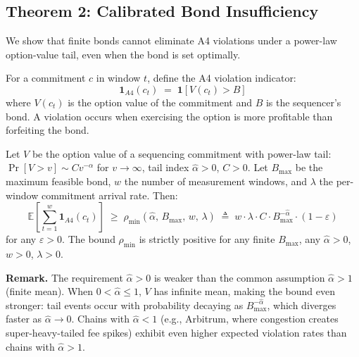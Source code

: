 
\subsection{Theorem 2: Calibrated Bond Insufficiency}
\label{sec:thm2}

We show that finite bonds cannot eliminate A4 violations under a power-law
option-value tail, even when the bond is set optimally.

\begin{definition}
\label{def:a4-viol}
For a commitment $c$ in window $t$, define the A4 violation indicator:
\[
  \mathbf{1}_{A4}(c_t) \;=\; \mathbf{1}\!\left[V(c_t) > B\right]
\]
where $V(c_t)$ is the option value of the commitment and $B$ is the sequencer's
bond. A violation occurs when exercising the option is more profitable than
forfeiting the bond.
\end{definition}

\begin{theorem}
\label{thm:bond-insufficient}
Let $V$ be the option value of a sequencing commitment with power-law tail:
$\Pr[V > v] \sim C v^{-\alpha}$ for $v \to \infty$, tail index $\hat{\alpha} > 0$,
$C > 0$. Let $B_{\max}$ be the maximum feasible bond, $w$ the number of
measurement windows, and $\lambda$ the per-window commitment arrival rate.
Then:
\[
  \mathbb{E}\!\left[\sum_{t=1}^{w} \mathbf{1}_{A4}(c_t)\right]
  \;\geq\;
  \rho_{\min}(\hat{\alpha},\, B_{\max},\, w,\, \lambda)
  \;\triangleq\;
  w \cdot \lambda \cdot C \cdot B_{\max}^{-\hat{\alpha}} \cdot (1-\varepsilon)
\]
for any $\varepsilon > 0$. The bound $\rho_{\min}$ is strictly positive for any
finite $B_{\max}$, any $\hat{\alpha} > 0$, $w > 0$, $\lambda > 0$.

\noindent\textbf{Remark.} The requirement $\hat{\alpha} > 0$ is weaker than the
common assumption $\hat{\alpha} > 1$ (finite mean). When $0 < \hat{\alpha} \leq 1$,
$V$ has infinite mean, making the bound even stronger: tail events occur with
probability decaying as $B_{\max}^{-\hat{\alpha}}$, which diverges faster as
$\hat{\alpha} \to 0$. Chains with $\hat{\alpha} < 1$ (e.g., Arbitrum, where
congestion creates super-heavy-tailed fee spikes) exhibit even higher expected
violation rates than chains with $\hat{\alpha} > 1$.
\end{theorem}

